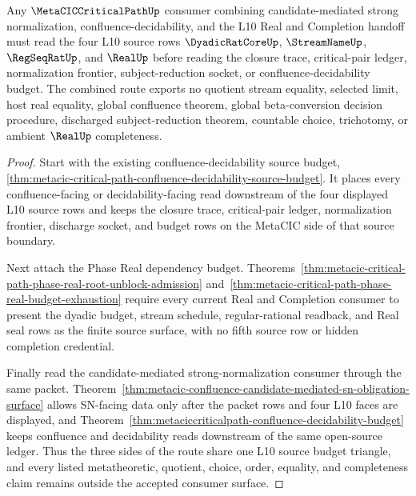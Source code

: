 \begin{theorem}
\label{thm:metacic-critical-path-real-completion-budget-triangle}
Any $\MetaCICCriticalPathUp$ consumer combining candidate-mediated strong normalization, confluence-decidability, and the L10 Real and Completion handoff must read the four L10 source rows $\DyadicRatCoreUp$, $\StreamNameUp$, $\RegSeqRatUp$, and $\RealUp$ before reading the closure trace, critical-pair ledger, normalization frontier, subject-reduction socket, or confluence-decidability budget. The combined route exports no quotient stream equality, selected limit, host real equality, global confluence theorem, global beta-conversion decision procedure, discharged subject-reduction theorem, countable choice, trichotomy, or ambient $\RealUp$ completeness.
\end{theorem}
\begin{proof}
Start with the existing confluence-decidability source budget, \autoref{thm:metacic-critical-path-confluence-decidability-source-budget}. It places every confluence-facing or decidability-facing read downstream of the four displayed L10 source rows and keeps the closure trace, critical-pair ledger, normalization frontier, discharge socket, and budget rows on the MetaCIC side of that source boundary.

Next attach the Phase Real dependency budget. Theorems~\ref{thm:metacic-critical-path-phase-real-root-unblock-admission} and~\ref{thm:metacic-critical-path-phase-real-budget-exhaustion} require every current Real and Completion consumer to present the dyadic budget, stream schedule, regular-rational readback, and Real seal rows as the finite source surface, with no fifth source row or hidden completion credential.

Finally read the candidate-mediated strong-normalization consumer through the same packet. Theorem~\ref{thm:metacic-confluence-candidate-mediated-sn-obligation-surface} allows SN-facing data only after the packet rows and four L10 faces are displayed, and Theorem~\ref{thm:metaciccriticalpath-confluence-decidability-budget} keeps confluence and decidability reads downstream of the same open-source ledger. Thus the three sides of the route share one L10 source budget triangle, and every listed metatheoretic, quotient, choice, order, equality, and completeness claim remains outside the accepted consumer surface.
\end{proof}
